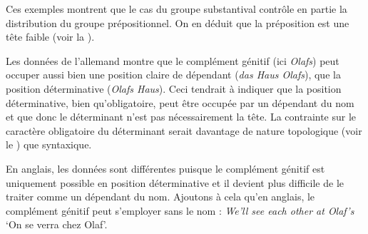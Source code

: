 {     Ces exemples montrent que le cas du groupe substantival contrôle en partie la distribution du groupe prépositionnel. On en déduit que la préposition est une tête faible (voir la ).

     Les données de l’allemand montre que le complément génitif (ici \textit{Olafs}) peut occuper aussi bien une position claire de dépendant (\textit{das Haus Olafs}), que la position déterminative (\textit{Olafs Haus}). Ceci tendrait à indiquer que la position déterminative, bien qu’obligatoire, peut être occupée par un dépendant du nom et que donc le déterminant n’est pas nécessairement la tête. La contrainte sur le caractère obligatoire du déterminant serait davantage de nature topologique (voir le ) que syntaxique.

    En anglais, les données sont différentes puisque le complément génitif est uniquement possible en position déterminative et il devient plus difficile de le traiter comme un dépendant du nom. Ajoutons à cela qu’en anglais, le complément génitif peut s’employer sans le nom : \textit{We’ll see each other at Olaf’s} ‘On se verra chez Olaf’.
}
